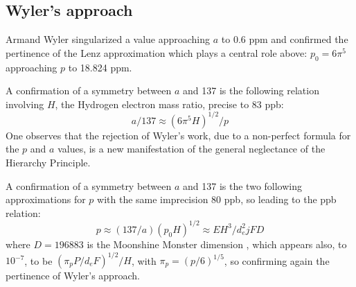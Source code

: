 \documentclass[twoside,draft]{article}
\begin{document}
\begin{sloppypar}
{\subsection {Wyler's approach}
Armand Wyler singularized a value approaching $a$ to 0.6 ppm and confirmed the pertinence
of the Lenz approximation which plays a central role above: $p_{0} = 6\pi^{5}$ approaching $p$ to 18.824 ppm.

A confirmation of a symmetry between $a$ and 137 is the following relation involving $H$, the
Hydrogen electron mass ratio, precise to 83 ppb:
$$a/137 \approx (6\pi^{5} H)^{1/2} /p$$
One observes that the rejection of Wyler's work, due to a non-perfect formula for the $p$ and $a$ values, is a new
manifestation of the general neglectance of the Hierarchy Principle.

A confirmation of a symmetry between $a$ and 137 is the two following approximations for $p$ with the same imprecision 80 ppb, so leading to the ppb relation:
 $$p \approx (137/a) (p_0 H)^{1/2}  \approx EH^3/d_e^2jFD $$ 
where $D = 196883$ is the Moonshine Monster dimension \cite{Conway}, which appears also, to $10^{-7}$, to be $(\pi_p P/d_eF)^{1/2}/H$, with $\pi_p = (p/6)^{1/5}$, so confirming again the pertinence of Wyler's approach. 

}
\end{sloppypar}
\end{document}
